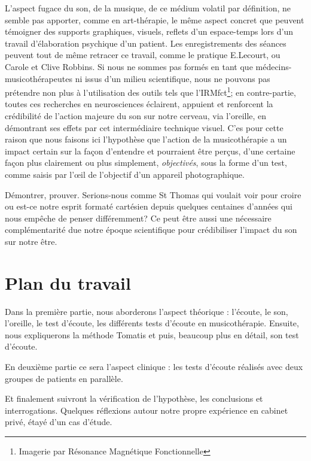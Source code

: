   
L'aspect fugace du son, de la musique, de ce médium volatil par
définition, ne semble pas apporter, comme en art-thérapie, le
même aspect concret que peuvent témoigner des supports graphiques,
visuels, reflets d'un espace-temps lors d'un travail d'élaboration
psychique d'un patient. Les enregistrements des séances peuvent tout de même retracer ce travail, comme le pratique E.Lecourt, ou Carole et Clive Robbins.
Si nous ne sommes pas formés en tant que médecins- musicothérapeutes ni issus d'un milieu scientifique, nous ne pouvons pas prétendre non plus à l'utilisation des outils
 tels que l'IRMfct\footnote{Imagerie par Résonance Magnétique Fonctionnelle}; en contre-partie, toutes ces recherches en
neurosciences éclairent, appuient et renforcent la crédibilité de l'action
majeure du son sur notre cerveau, via l'oreille, en démontrant ses effets par cet intermédiaire technique visuel. C'es pour cette raison que nous  faisons ici l'hypothèse que l'action de la musicothérapie a un impact certain sur la façon d'entendre et  pourraient être perçus, d'une certaine façon plus
clairement ou plus simplement, \textsl{objectivés}, sous la forme d'un test, comme saisis par l'\oe il de l'objectif d'un appareil
photographique.


Démontrer, prouver.
Serions-nous comme St Thomas qui voulait voir pour croire ou est-ce notre esprit formaté cartésien depuis quelques centaines d'années qui nous empêche de penser différemment? Ce peut être aussi une nécessaire complémentarité due notre époque scientifique pour crédibiliser l'impact du son sur notre être. 


\section{Plan du travail}

Dans la première partie, nous aborderons l'aspect théorique : l'écoute, le son, l'oreille, le test d'écoute, les différents tests d'écoute en musicothérapie.  Ensuite, nous expliquerons  la méthode Tomatis
et puis, beaucoup plus en détail, son test d'écoute.

En deuxième partie ce sera l'aspect clinique : les tests d'écoute réalisés  avec deux groupes de patients en parallèle.

Et finalement suivront la vérification de l'hypothèse, les conclusions et interrogations. 
Quelques réflexions autour notre propre expérience en cabinet privé, étayé d'un cas d'étude.
